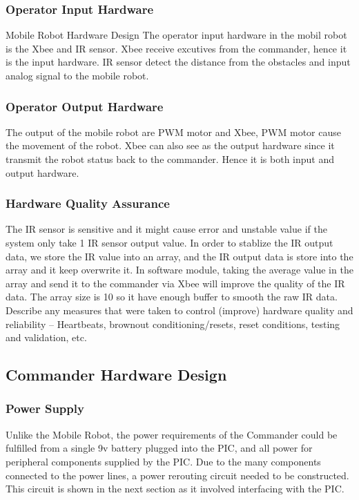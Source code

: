 \documentclass[11pt,a4paper]{article}
\begin{document}
    \subsubsection{Operator Input Hardware}
    Mobile Robot Hardware Design
    The operator input hardware in the mobil robot is the Xbee and IR sensor. Xbee receive excutives from the commander,         hence it is the input hardware. IR sensor detect the distance from the obstacles and input analog signal to the mobile 
    robot.  
    \subsubsection{Operator Output Hardware}
    The output of the mobile robot are PWM motor and Xbee, PWM motor cause the movement of the robot. Xbee can also see as the output hardware since it transmit the robot status back to the commander. Hence it is both input and output hardware. 
    \subsubsection{Hardware Quality Assurance}
      The IR sensor is sensitive and it might cause error and unstable value if the system only take 1 IR sensor output value. In order to stablize the IR output data, we store the IR value into an array, and the IR output data is store into the array and it keep overwrite it. In software module, taking the average value in the array and send it to the commander via Xbee will improve the quality of the IR data. The array size is 10 so it have enough buffer to smooth the raw IR data.\\
      
    Describe any measures that were taken to control (improve) hardware quality and reliability – Heartbeats, brownout conditioning/resets, reset conditions, testing and validation, etc.
  \subsection{Commander Hardware Design}
    \subsubsection{Power Supply}
      Unlike the Mobile Robot, the power requirements of the Commander could be fulfilled from a single 9v battery plugged into the PIC, and all power for peripheral components supplied by the PIC. Due to the many components connected to the power lines, a power rerouting circuit needed to be constructed. This circuit is shown in the next section as it involved interfacing with the PIC.
\end{document}
